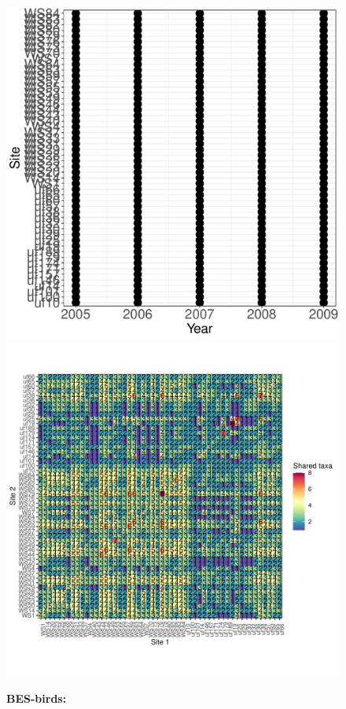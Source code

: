 \documentclass[11pt, oneside]{article}
\begin{document}
\begin{figure}[h!]
\includegraphics[scale = 0.4]{bes-birds-nilon_spatiotemporal_sampling_effort.pdf}
\includegraphics[scale = 0.4]{bes-birds-nilon_spp_shared.pdf}
\caption{{\bf BES-birds:} }
\label{bes-birds}
\end{figure}



\renewcommand{\refname}{\subsection*{References}}

\end{document}

